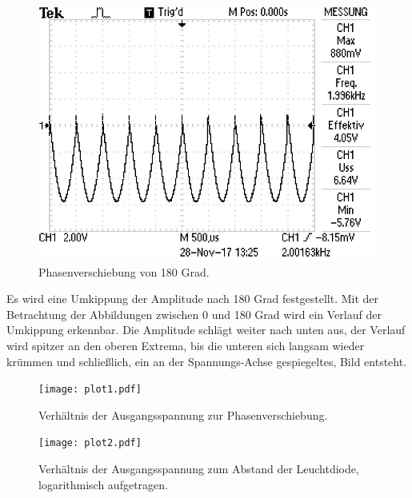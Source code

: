 \begin{figure}
  \centering
  \includegraphics{Phase5.jpg}
  \caption{Phasenverschiebung von 180 Grad.}
  \label{fig:Phase5}
\end{figure}

Es wird eine Umkippung der Amplitude nach 180 Grad festgestellt. 
Mit der Betrachtung der Abbildungen zwischen 0 und 180 Grad wird ein Verlauf der Umkippung erkennbar.
Die Amplitude schlägt weiter nach unten aus, der Verlauf wird spitzer an den oberen Extrema, bis die unteren sich langsam wieder krümmen und schließlich, ein an der Spannungs-Achse gespiegeltes, Bild entsteht. 

\begin{figure}
  \centering
  \texttt{[image: plot1.pdf]}
  \caption{Verhältnis der Ausgangsspannung zur Phasenverschiebung.}
  \label{fig:plot1}
\end{figure}

\begin{figure}
  \centering
  \texttt{[image: plot2.pdf]}
  \caption{Verhältnis der Ausgangsspannung zum Abstand der Leuchtdiode, logarithmisch aufgetragen.}
  \label{fig:plot2}
\end{figure}
